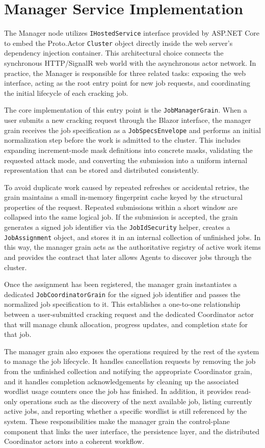 \section{Manager Service Implementation}

The Manager node utilizes \verb|IHostedService| interface provided by ASP.NET Core to embed the Proto.Actor \verb|Cluster| object directly inside the web server's dependency injection container. This architectural choice connects the synchronous HTTP/SignalR web world with the asynchronous actor network. In practice, the Manager is responsible for three related tasks: exposing the web interface, acting as the root entry point for new job requests, and coordinating the initial lifecycle of each cracking job.

The core implementation of this entry point is the \verb|JobManagerGrain|. When a user submits a new cracking request through the Blazor interface, the manager grain receives the job specification as a \verb|JobSpecsEnvelope| and performs an initial normalization step before the work is admitted to the cluster. This includes expanding increment-mode mask definitions into concrete masks, validating the requested attack mode, and converting the submission into a uniform internal representation that can be stored and distributed consistently.

To avoid duplicate work caused by repeated refreshes or accidental retries, the grain maintains a small in-memory fingerprint cache keyed by the structural properties of the request. Repeated submissions within a short window are collapsed into the same logical job. If the submission is accepted, the grain generates a signed job identifier via the \verb|JobIdSecurity| helper, creates a \verb|JobAssignment| object, and stores it in an internal collection of unfinished jobs. In this way, the manager grain acts as the authoritative registry of active work items and provides the contract that later allows Agents to discover jobs through the cluster.

 Once the assignment has been registered, the manager grain instantiates a dedicated \verb|JobCoordinatorGrain| for the signed job identifier and passes the normalized job specification to it. This establishes a one-to-one relationship between a user-submitted cracking request and the dedicated Coordinator actor that will manage chunk allocation, progress updates, and completion state for that job.

The manager grain also exposes the operations required by the rest of the system to manage the job lifecycle. It handles cancellation requests by removing the job from the unfinished collection and notifying the appropriate Coordinator grain, and it handles completion acknowledgements by cleaning up the associated wordlist usage counters once the job has finished. In addition, it provides read-only operations such as the discovery of the next available job, listing currently active jobs, and reporting whether a specific wordlist is still referenced by the system. These responsibilities make the manager grain the control-plane component that links the user interface, the persistence layer, and the distributed Coordinator actors into a coherent workflow.


